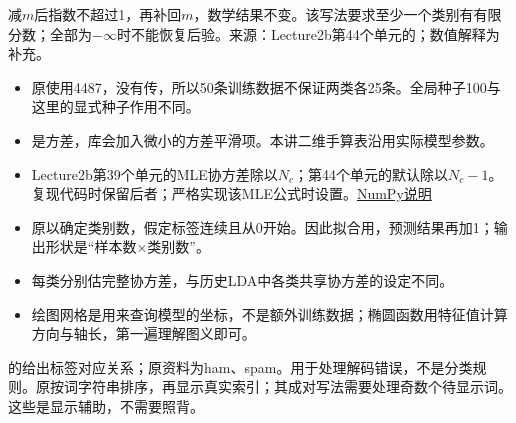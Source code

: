减\(m\)后指数不超过1，再补回\(m\)，数学结果不变。该写法要求至少一个类别有有限分数；全部为\(-\infty\)时不能恢复后验。来源：Lecture2b第44个单元的；数值解释为补充。






\begin{itemize}

\item 原使用4487，没有传，所以50条训练数据不保证两类各25条。全局种子100与这里的显式种子作用不同。

\item {}是方差，库会加入微小的方差平滑项。本讲二维手算表沿用实际模型参数。

\item Lecture2b第39个单元的MLE协方差除以\(N_c\)；第44个单元的默认除以\(N_c-1\)。复现代码时保留后者；严格实现该MLE公式时设置。\href{https://numpy.org/doc/stable/reference/generated/numpy.cov.html}{NumPy说明}

\item 原以确定类别数，假定标签连续且从0开始。因此拟合用，预测结果再加1；输出形状是“样本数\ensuremath{\times}类别数”。

\item 每类分别估完整协方差，与历史LDA中各类共享协方差的设定不同。

\item 绘图网格是用来查询模型的坐标，不是额外训练数据；椭圆函数用特征值计算方向与轴长，第一遍理解图义即可。

\end{itemize}





的给出标签对应关系；原资料为ham、spam。用于处理解码错误，不是分类规则。原按词字符串排序，再显示真实索引；其成对写法需要处理奇数个待显示词。这些是显示辅助，不需要照背。


